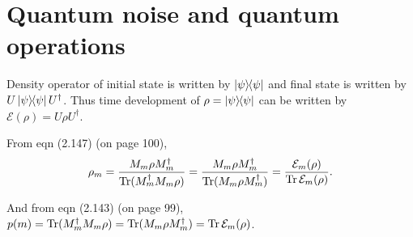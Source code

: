 \chapter{Quantum noise and quantum operations}
Density operator of initial state is written by $\ket{\psi}\hspace{-1mm} \bra{\psi}$ and final state is written by $U\ket{\psi}\hspace{-1mm} \bra{\psi}U^\dagger$.
Thus time development of $\rho = \ket{\psi}\hspace{-1mm} \bra{\psi}$ can be written by $\mathcal{E}(\rho) = U\rho U^\dagger$.

From eqn (2.147) (on page 100),
\begin{align*}
	\rho_m = \frac{M_m \rho M_m^\dagger}{\operatorname{Tr} (M_m^\dagger  M_m\rho ) }
					= \frac{M_m \rho M_m^\dagger}{\operatorname{Tr} ( M_m \rho M_m^\dagger ) }
					= \frac{\mathcal{E}_m (\rho)}{\operatorname{Tr} \mathcal{E}_m (\rho)}.
\end{align*}

And from eqn (2.143) (on page 99), $p(m) = \operatorname{Tr} (M_m^\dagger M_m \rho) = \operatorname{Tr} (M_m \rho M_m^\dagger) = \operatorname{Tr} \mathcal{E}_m (\rho)$.





